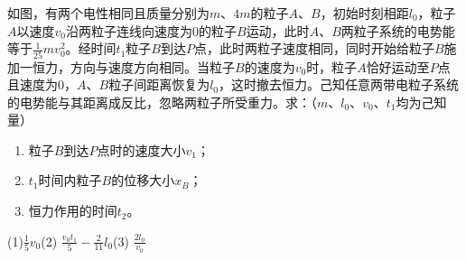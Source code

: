 如图，有两个电性相同且质量分别为\(m\)、\(4m\)的粒子\(A\)、\(B\)，初始时刻相距\(l_0\)，粒子\(A\)以速度\(v_0\)沿两粒子连线向速度为0的粒子\(B\)运动，此时\(A\)、\(B\)两粒子系统的电势能等于\(\frac{1}{25}mv_0^2\)。经时间\(t_1\)粒子\(B\)到达\(P\)点，此时两粒子速度相同，同时开始给粒子\(B\)施加一恒力，方向与速度方向相同。当粒子\(B\)的速度为\(v_0\)时，粒子\(A\)恰好运动至\(P\)点且速度为0，\(A\)、\(B\)粒子间距离恢复为\(l_0\)，这时撤去恒力。己知任意两带电粒子系统的电势能与其距离成反比，忽略两粒子所受重力。求：（\(m\)、\(l_0\)、\(v_0\)、\(t_1\)均为己知量）
\begin{enumerate}
	\item 粒子\(B\)到达\(P\)点时的速度大小\(v_1\)；
	\item \(t_1\)时间内粒子\(B\)的位移大小\(x_B\)；
	\item 恒力作用的时间\(t_2\)。
\end{enumerate}

\begin{answer}
	(1)\(\frac{1}{5}v_0\)\qquad (2) \(\frac{v_0t_1}{5} - \frac{2}{11}l_0\)\qquad (3) \(\frac{2l_0}{v_0}\)
\end{answer}